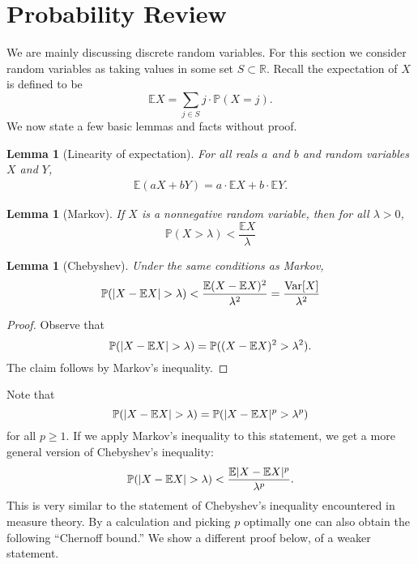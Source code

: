 \documentclass[11pt]{article}
\DeclarePairedDelimiter\abs{\lvert}{\rvert}
\newcommand{\R}{\mathbb{R}}
\newtheorem{lemma}[theorem]{Lemma}
\begin{document}
\section{Probability Review}

We are mainly discussing discrete random variables. For this section we consider random variables as taking values in some set $S \subset \R$. Recall the expectation of $X$ is defined to be 
\[
    \mathbb{E}{X} = \sum_{j \in S}j \cdot \mathbb{P}(X = j).
\]
We now state a few basic lemmas and facts without proof.

\begin{lemma}[Linearity of expectation]
For all reals $a$ and $b$ and random variables $X$ and $Y$,
\begin{align} 
    \mathbb{E}(aX + bY) = a \cdot \mathbb{E}{X} + b \cdot \mathbb{E}{Y}.
\end{align} 
\end{lemma}

\begin{lemma}[Markov]
If $X$ is a nonnegative random variable, then for all $\lambda > 0$,
\[
    \mathbb{P}(X > \lambda) < \frac{\mathbb{E}{X}}{\lambda}
\]
\end{lemma}

\begin{lemma}[Chebyshev]
Under the same conditions as Markov,
\begin{align}
    \mathbb{P}(\abs{X - \mathbb{E}{X}} > \lambda) < \frac{\mathbb{E}(X - \mathbb{E}{X})^2}{\lambda^2} = \frac{\operatorname{Var}[X]}{\lambda^2}
\end{align}
\end{lemma}

\begin{proof}
Observe that
\[
    \mathbb{P}(\abs{X - \mathbb{E}X} > \lambda) = \mathbb{P}((X - \mathbb{E}X)^2 > \lambda^2).
\]
The claim follows by Markov's inequality.
\end{proof}

Note that
\[
    \mathbb{P}(\abs{X - \mathbb{E}X} > \lambda) = \mathbb{P}(\abs{X - \mathbb{E}X}^p > \lambda^p)
\]
for all $p \geq 1$. If we apply Markov's inequality to this statement, we get a more general version of Chebyshev's inequality:
\begin{align}
    \mathbb{P}(\abs{X - \mathbb{E}X} > \lambda) < \frac{\mathbb{E}\abs{X - \mathbb{E}X}^p}{\lambda^p}.
\end{align}
This is very similar to the statement of Chebyshev's inequality encountered in measure theory. By a calculation and picking $p$ optimally one can also obtain the following ``Chernoff bound.'' We show a different proof below, of a weaker statement.
\end{document}
